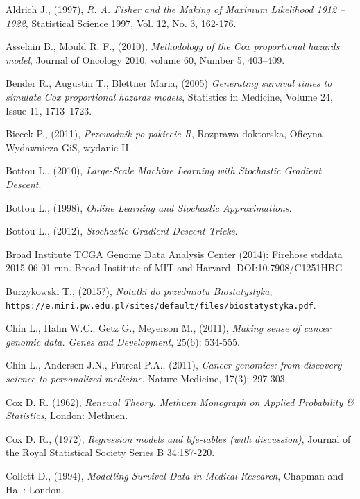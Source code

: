 \begin{thebibliography}{99}

 Aldrich J., (1997), \textit{R. A. Fisher and the Making of Maximum Likelihood 1912 – 1922}, Statistical Science 1997, Vol. 12, No. 3, 162-176.

 Asselain B., Mould R. F., (2010), \textit{Methodology of the Cox proportional hazards model},  Journal of Oncology 2010, volume 60, Number 5,  403–409.

 Bender R., Augustin T., Blettner Maria, (2005) \textit{Generating survival times to simulate Cox proportional hazards models}, Statistics in Medicine, Volume 24, Issue 11, 1713–1723.

 Biecek P., (2011), \textit{Przewodnik po pakiecie R}, Rozprawa doktorska, Oficyna Wydawnicza GiS, wydanie II.

 Bottou L., (2010), \textit{Large-Scale Machine Learning with Stochastic Gradient Descent}.

 Bottou L., (1998), \textit{Online Learning and Stochastic Approximations}.

 Bottou L., (2012), \textit{Stochastic Gradient Descent Tricks}.

 Broad Institute TCGA Genome Data Analysis Center (2014): Firehose stddata 2015 06 01 run. Broad Institute of MIT and Harvard. DOI:10.7908/C1251HBG

 Burzykowski T., (2015?), \textit{Notatki do przedmiotu Biostatystyka}, \texttt{https://e.mini.pw.edu.pl/sites/default/files/biostatystyka.pdf}.

 Chin L., Hahn W.C., Getz G., Meyerson M., (2011), \textit{Making sense of cancer genomic data. Genes and Development}, 25(6): 534-555.

 Chin L., Andersen J.N., Futreal P.A., (2011), \textit{Cancer genomics: from discovery science to personalized medicine}, Nature Medicine, 17(3): 297-303.

 Cox D. R. (1962), \textit{Renewal Theory. Methuen Monograph on Applied Probability
\& Statistics}, London: Methuen.

  Cox D. R., (1972), \textit{Regression models and life-tables (with discussion)}, Journal of the Royal Statistical Society Series B 34:187-220. 


 Collett D., (1994), \textit{Modelling Survival Data in Medical Research}, Chapman and Hall:
London.


\end{thebibliography}
